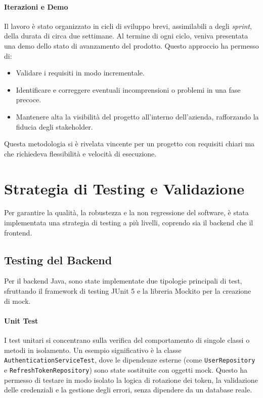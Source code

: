 \documentclass[12pt,a4paper,openright,twoside]{book}
\begin{document}
\paragraph{Iterazioni e Demo} Il lavoro è stato organizzato in cicli di sviluppo brevi, assimilabili a degli \textit{sprint}, della durata di circa due settimane. Al termine di ogni ciclo, veniva presentata una demo dello stato di avanzamento del prodotto. Questo approccio ha permesso di:
\begin{itemize}
    \item Validare i requisiti in modo incrementale.
    \item Identificare e correggere eventuali incomprensioni o problemi in una fase precoce.
    \item Mantenere alta la visibilità del progetto all'interno dell'azienda, rafforzando la fiducia degli stakeholder.
\end{itemize}
Questa metodologia si è rivelata vincente per un progetto con requisiti chiari ma che richiedeva flessibilità e velocità di esecuzione.

\section{Strategia di Testing e Validazione}
\label{sec:testing}
Per garantire la qualità, la robustezza e la non regressione del software, è stata implementata una strategia di testing a più livelli, coprendo sia il backend che il frontend.

\subsection{Testing del Backend}
Per il backend Java, sono state implementate due tipologie principali di test, sfruttando il framework di testing JUnit 5 e la libreria Mockito per la creazione di mock.

\paragraph{Unit Test} I test unitari si concentrano sulla verifica del comportamento di singole classi o metodi in isolamento. Un esempio significativo è la classe \texttt{AuthenticationServiceTest}, dove le dipendenze esterne (come \texttt{UserRepository} e \texttt{RefreshTokenRepository}) sono state sostituite con oggetti mock. Questo ha permesso di testare in modo isolato la logica di rotazione dei token, la validazione delle credenziali e la gestione degli errori, senza dipendere da un database reale.
\end{document}
